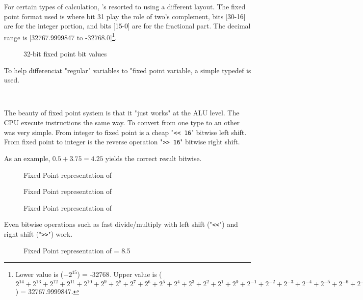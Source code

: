 For certain types of calculation, \doom's resorted to using a different layout. The fixed point format used is  where bit 31 play the role of two's complement, bits [30-16] are for the integer portion, and bits [15-0] are for the fractional part. The decimal range is [32767.9999847 to -32768.0]\footnote{
Lower value is ($-2^{15}$) = -32768. Upper value is  
 ($2^{14} + 2^{13} + 2^{12} + 2^{11} + 2^{10} + 2^9 + 2^8 + 2^7 + 2^6 + 2^5 + 2^4 + 2^3 + 2^2 + 2^1 + 2^0 + 2^{-1} + 2^{-2}+ 2^{-3}+ 2^{-4}+ 2^{-5}+ 2^{-6}+ 2^{-7}+ 2^{-8}+ 2^{-9}+ 2^{-10}+ 2^{-11}+ 2^{-12}+ 2^{-13}+ 2^{-14}+ 2^{-15}+ 2^{-16}$) = 32767.9999847.}.\\
\par
\begin{figure}[H]
 \centering
  
  \caption{32-bit \doom{} fixed point bit values}
\end{figure}
\par 
To help differenciat "regular" variables to "fixed point variable, a simple typedef  is used.\\
\par
{}\\
\par
The beauty of fixed point system is that it "just works" at the ALU level. The CPU execute instructions the same way. To convert from one type to an other was very simple. From integer to fixed point is a cheap "\verb!<< 16!" bitwise left shift. From fixed point to integer is the reverse operation "\verb|>> 16|" bitwise right shift.\\
\par


As an example, $0.5 + 3.75 = 4.25$ yields the correct result bitwise.\\
\par
\begin{figure}[H]
  \centering
  
  \caption{Fixed Point representation of }
\end{figure}
\begin{figure}[H]
  \centering
  
  \caption{Fixed Point representation of }
\end{figure}
\begin{figure}[H]
  \centering
  
  \caption{Fixed Point representation of }
\end{figure}
\par
Even bitwise operations such as fast divide/multiply with left shift ("\verb!<<!") and right shift ("\verb|>>|") work.\\
\par
\begin{figure}[H]
  \centering
  
  \caption{Fixed Point representation of  = 8.5}
\end{figure}
\par


